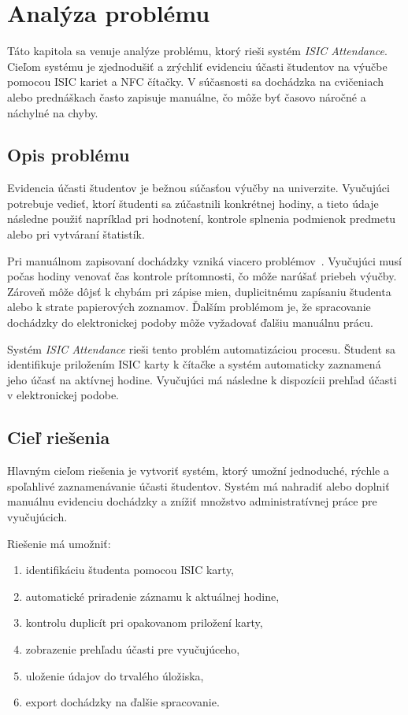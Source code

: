 \chapter{Analýza problému}
\label{chap:problem-analysis}

Táto kapitola sa venuje analýze problému, ktorý rieši systém \textit{ISIC Attendance}. Cieľom systému je zjednodušiť a zrýchliť evidenciu účasti študentov na výučbe pomocou ISIC kariet a NFC čítačky. V súčasnosti sa dochádzka na cvičeniach alebo prednáškach často zapisuje manuálne, čo môže byť časovo náročné a náchylné na chyby.

\section{Opis problému}
\label{sec:problem-description}

Evidencia účasti študentov je bežnou súčasťou výučby na univerzite. Vyučujúci potrebuje vedieť, ktorí študenti sa zúčastnili konkrétnej hodiny, a tieto údaje následne použiť napríklad pri hodnotení, kontrole splnenia podmienok predmetu alebo pri vytváraní štatistík.

Pri manuálnom zapisovaní dochádzky vzniká viacero problémov~\cite{dixon:nfc-iot-attendance,benyo:nfc-attendance}. Vyučujúci musí počas hodiny venovať čas kontrole prítomnosti, čo môže narúšať priebeh výučby. Zároveň môže dôjsť k chybám pri zápise mien, duplicitnému zapísaniu študenta alebo k strate papierových zoznamov. Ďalším problémom je, že spracovanie dochádzky do elektronickej podoby môže vyžadovať ďalšiu manuálnu prácu.

Systém \textit{ISIC Attendance} rieši tento problém automatizáciou procesu. Študent sa identifikuje priložením ISIC karty k čítačke a systém automaticky zaznamená jeho účasť na aktívnej hodine. Vyučujúci má následne k dispozícii prehľad účasti v elektronickej podobe.

\section{Cieľ riešenia}
\label{sec:solution-goal}

Hlavným cieľom riešenia je vytvoriť systém, ktorý umožní jednoduché, rýchle a spoľahlivé zaznamenávanie účasti študentov. Systém má nahradiť alebo doplniť manuálnu evidenciu dochádzky a znížiť množstvo administratívnej práce pre vyučujúcich.

Riešenie má umožniť:
\begin{enumerate}
    \item identifikáciu študenta pomocou ISIC karty,
    \item automatické priradenie záznamu k aktuálnej hodine,
    \item kontrolu duplicít pri opakovanom priložení karty,
    \item zobrazenie prehľadu účasti pre vyučujúceho,
    \item uloženie údajov do trvalého úložiska,
    \item export dochádzky na ďalšie spracovanie.
\end{enumerate}

